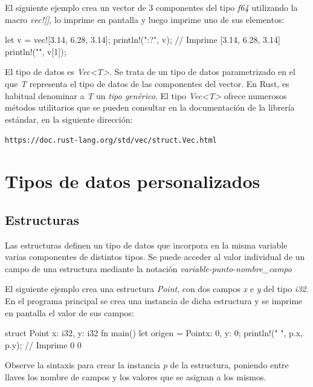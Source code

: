 El siguiente ejemplo crea un vector de 3 componentes del tipo \textit{f64} utilizando la macro \textit{vec![]}, lo imprime en pantalla y luego imprime uno de sus elementos:

\vspace{0.7em}
\begin{Codigo}
let v = vec![3.14, 6.28, 3.14];
println!("{:?}", v); // Imprime [3.14, 6.28, 3.14]
println!("{}", v[1]);
\end{Codigo}

El tipo de datos es \textit{Vec<T>}. Se trata de un tipo de datos parametrizado en el que \textit{T} representa el tipo de datos de las componentes del vector. En Rust, es habitual denominar a \textit{T} un \textit{tipo genérico}. El tipo \textit{Vec<T>} ofrece numerosos métodos utilitarios que se pueden consultar en la documentación de la librería estándar, en la siguiente dirección:

{\centering \texttt{https://doc.rust-lang.org/std/vec/struct.Vec.html} \par}   

\section{Tipos de datos personalizados}

\subsection{Estructuras}
Las estructuras definen un tipo de datos que incorpora en la misma variable varias componentes de distintos tipos. Se puede acceder al valor individual de un campo de una estructura mediante la notación \textit{variable-punto-nombre\_campo}

El siguiente ejemplo crea una estructura \textit{Point}, con dos campos \textit{x} e \textit{y} del tipo \textit{i32}. En el programa principal se crea una instancia de dicha estructura y se imprime en pantalla el valor de sus campos:

\vspace{0.7em}
\begin{Codigo}
struct Point {
   x: i32,
   y: i32
}
fn main() {
   let origen = Point{x: 0, y: 0};
   println!("{} {}", p.x, p.y); // Imprime 0 0
}
\end{Codigo}

Observe la sintaxis para crear la instancia \textit{p} de la estructura, poniendo entre llaves los nombre de campos y los valores que se asignan a los mismos.

